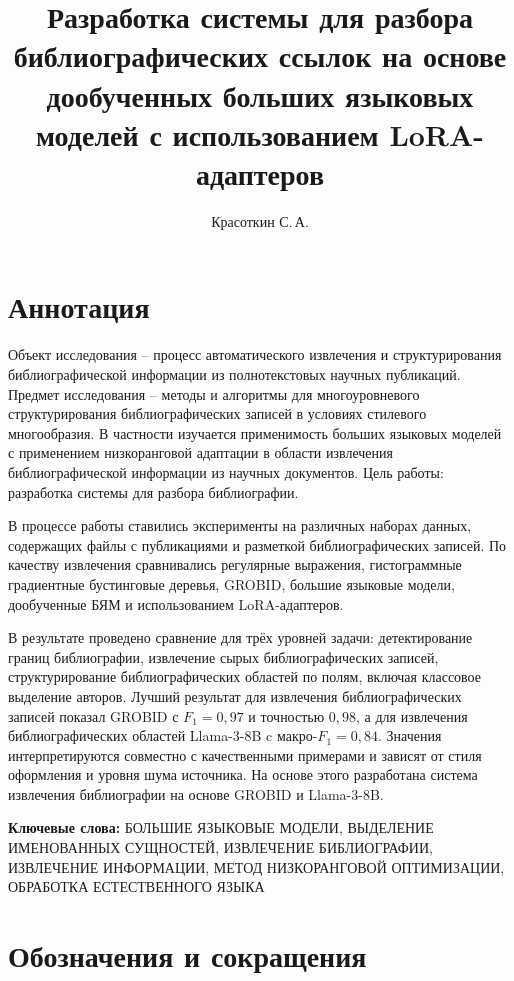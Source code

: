 \documentclass{mipt-thesis-ms}
\title{Разработка системы для разбора библиографических ссылок на основе дообученных больших языковых моделей с использованием LoRA-адаптеров}
\author{Красоткин С.\,А.}
\begin{document}
\thispagestyle{empty}  
\titlepage
\setcounter{page}{1}   

\clearpage              
\pagestyle{miptthesis}  
\setcounter{page}{2}    

\chapter*{Аннотация}

Объект исследования -- процесс автоматического извлечения и структурирования библиографической информации из полнотекстовых научных публикаций. 
Предмет исследования -- методы и алгоритмы для многоуровневого структурирования библиографических записей в условиях стилевого многообразия. В частности изучается применимость больших языковых моделей с применением низкоранговой адаптации в области извлечения библиографической информации из научных документов.
Цель работы: разработка системы для разбора библиографии.

В процессе работы ставились эксперименты на различных наборах данных, содержащих файлы с публикациями и разметкой библиографических записей. По качеству извлечения сравнивались регулярные выражения, гистограммные градиентные бустинговые деревья\cite{kopanichuk2025structure}, GROBID\cite{romary2015grobid}, большие языковые модели, дообученные БЯМ и использованием LoRA-адаптеров.

В результате проведено сравнение для трёх уровней задачи: детектирование границ библиографии, извлечение сырых библиографических записей, структурирование библиографических областей по полям, включая классовое выделение авторов. Лучший результат для извлечения библиографических записей показал GROBID с $F_1 = 0{,}97$ и точностью $0{,}98$, а для извлечения библиографических областей Llama-3-8B c макро-$F_1 = 0{,}84$. Значения интерпретируются совместно с качественными примерами и зависят от стиля оформления и уровня шума источника. На основе этого разработана система извлечения библиографии на основе GROBID и Llama-3-8B. 

\medskip
\noindent \textbf{Ключевые слова:} БОЛЬШИЕ ЯЗЫКОВЫЕ МОДЕЛИ, ВЫДЕЛЕНИЕ ИМЕНОВАННЫХ СУЩНОСТЕЙ, ИЗВЛЕЧЕНИЕ БИБЛИОГРАФИИ, ИЗВЛЕЧЕНИЕ ИНФОРМАЦИИ, МЕТОД НИЗКОРАНГОВОЙ ОПТИМИЗАЦИИ, ОБРАБОТКА ЕСТЕСТВЕННОГО ЯЗЫКА

\clearpage

\titlecontents 

\chapter*{Обозначения и сокращения}
\end{document}
